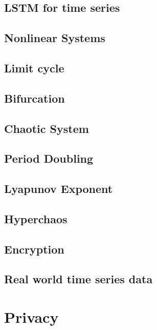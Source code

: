 \documentclass[11pt,fleqn]{book} %
\begin{document}
\chapter{LSTM for time series}
\chapter{Nonlinear Systems}
\chapter{Limit cycle}
\chapter{Bifurcation}
\chapter{Chaotic System}
\chapter{Period Doubling}
\chapter{Lyapunov Exponent}
\chapter{Hyperchaos}
\chapter{Encryption}
\chapter{Real world time series data}

\part{Privacy}

\end{document}
